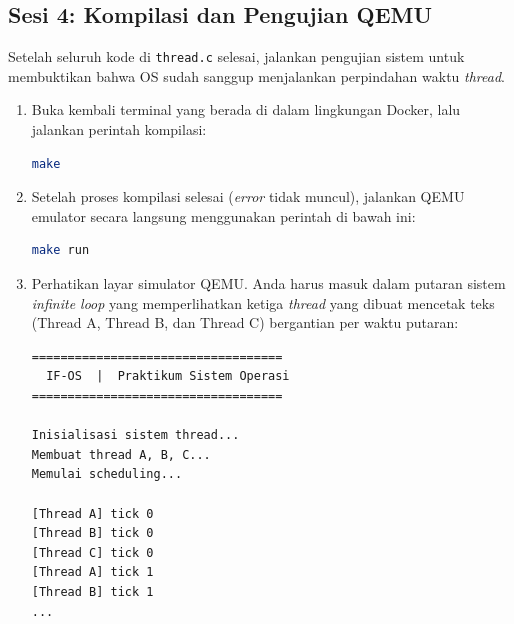 \subsection{Sesi 4: Kompilasi dan Pengujian QEMU}
\label{sec:m08-sesi-4}
Setelah seluruh kode di \texttt{thread.c} selesai, jalankan pengujian sistem untuk membuktikan bahwa OS sudah sanggup menjalankan perpindahan waktu \textit{thread}.

\begin{enumerate}
    \item Buka kembali terminal yang berada di dalam lingkungan Docker, lalu jalankan perintah kompilasi:
    \begin{lstlisting}[language=bash, caption={Perintah build pada terminal Docker}]
make
    \end{lstlisting}
    \item Setelah proses kompilasi selesai (\textit{error} tidak muncul), jalankan QEMU emulator secara langsung menggunakan perintah di bawah ini:
    \begin{lstlisting}[language=bash, caption={Menjalankan OS pada terminal Docker}]
make run
    \end{lstlisting}
    \item Perhatikan layar simulator QEMU. Anda harus masuk dalam putaran sistem \textit{infinite loop} yang memperlihatkan ketiga \textit{thread} yang dibuat mencetak teks (Thread A, Thread B, dan Thread C) bergantian per waktu putaran:
    \begin{lstlisting}[caption={Ekspektasi output sistem penjadwalan Thread di latar QEMU}]
===================================
  IF-OS  |  Praktikum Sistem Operasi
===================================

Inisialisasi sistem thread...
Membuat thread A, B, C...
Memulai scheduling...

[Thread A] tick 0
[Thread B] tick 0
[Thread C] tick 0
[Thread A] tick 1
[Thread B] tick 1
...
    \end{lstlisting}
\end{enumerate}
